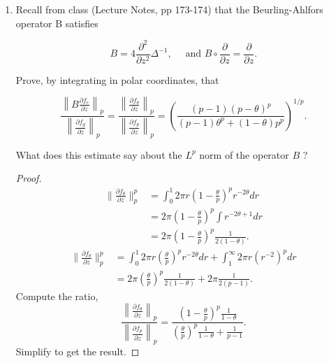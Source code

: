 \begin{enumerate}
\begin{proof}
	\begin{proof}[Proof of Lemma]
		Recall the definition
		\[
			\frac{\partial }{\partial z} = \frac{1}{2}\left( \frac{\partial }{\partial x}  - i \frac{\partial }{\partial y}  \right) 
		.\] 
\[
			\frac{\partial }{\partial \overline{z} } = \frac{1}{2}\left( \frac{\partial }{\partial x}  + i \frac{\partial }{\partial y}  \right) 
		.\]
		Apply to $P(z, \overline{z} ) = z = x + i y$,
		\[
			\frac{\partial }{\partial z} (x + i y) = \frac{1}{2} ( 1 - i * i) = 1
		.\] 
		\[
			\frac{\partial }{\partial \overline{z} }  (x + i y) = \frac{1}{2}(1 + i * i) = 0
		.\] 
		Those are consistent with our result. Result for higher-order polynomials follow from induction on the degree.
	\end{proof}
	
\end{proof}

\item 
Recall from class (Lecture Notes, pp 173-174) that the Beurling-Ahlfors operator B satisfies

\[
B=4 \frac{\partial^2}{\partial z^2} \Delta^{-1}, \quad \text { and } B \circ \frac{\partial}{\partial z}=\frac{\partial}{\partial z} .
\]


Prove, by integrating in polar coordinates, that

\[
\frac{\left\|B \frac{\partial f_e}{\partial z}\right\|_p}{\left\|\frac{\partial f_g}{\partial z}\right\|_p}
=\frac{\left\|\frac{\partial f_\theta}{\partial z}\right\|_p}{\left\|\frac{\partial f_p}{\partial z}\right\|_p}
=\left(\frac{(p-1)(p-\theta)^p}{(p-1) \theta^p+(1-\theta) p^p}\right)^{1 / p} .
\]


What does this estimate say about the $L^p$ norm of the operator $B$ ?

\begin{proof}
	\begin{align*}
		\|\frac{\partial f_ \theta}{\partial z} \|_p^p
		&= \int _0^1 2 \pi r \left( 1 - \frac{\theta}{p} \right)^p r^{- 2 \theta} d r  \\
		&= 2 \pi \left( 1 - \frac{\theta}{p} \right) ^p \int r^{- 2 \theta + 1} dr \\
		&= 2 \pi \left( 1 - \frac{\theta}{p} \right) ^p \frac{1}{2(1 - \theta)}
	.\end{align*}
\begin{align*}
		\|\frac{\partial f_ \theta}{\partial \overline{z} } \|_p^p
		&= \int _0^1 2 \pi r \left( \frac{\theta}{p} \right)^p r^{- 2 \theta} d r  + \int _1^\infty 2 \pi r (r^{-2})^p dr\\
		&= 2 \pi \left( \frac{\theta}{p} \right) ^p \frac{1}{2(1 - \theta)} + 2 \pi \frac{1}{2(p - 1)}
	.\end{align*}
	Compute the ratio,
\[
\frac{\left\|\frac{\partial f_\theta}{\partial z}\right\|_p}{\left\|\frac{\partial f_p}{\partial z}\right\|_p}
= \frac{\left( 1 - \frac{\theta}{p} \right) ^p \frac{1}{1 - \theta}}{\left( \frac{\theta}{p} \right) ^p \frac{1}{1 - \theta} + \frac{1}{p - 1}}
.\] 
Simplify to get the result.
\end{proof}


\end{enumerate}
